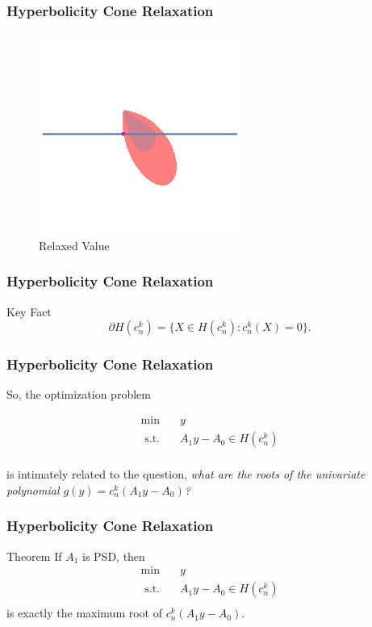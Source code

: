 \documentclass{beamer}
\newcommand{\st}{{\text{ s.t. }}}
\begin{document}
\begin{frame}
    \frametitle{Hyperbolicity Cone Relaxation}
    \begin{figure}[htpb]
        \centering
        \includegraphics[width=0.6\linewidth]{relaxed.png}
        \caption{Relaxed Value}%
        \label{fig:comparison_line}
    \end{figure}
\end{frame}
\begin{frame}
    \frametitle{Hyperbolicity Cone Relaxation}
    \begin{block}{Key Fact}
        \[\partial H(c_n^k) = \{X \in H(c_n^k) : c_n^k(X) = 0\}.\]
    \end{block}
\end{frame}
\begin{frame}
    \frametitle{Hyperbolicity Cone Relaxation}
    So, the optimization problem 

    \begin{equation*}
        \begin{aligned}
            \min\quad & y\\
            \st & A_1y - A_0 \in H(c_n^k)\\
        \end{aligned}
    \end{equation*}

    is intimately related to the question, \emph{what are the roots of the univariate polynomial $g(y) = c_n^k(A_1y-A_0)$?}
\end{frame}
\begin{frame}
    \frametitle{Hyperbolicity Cone Relaxation}
    \begin{block}{Theorem}
        If $A_1$ is PSD, then 
        \begin{equation*}
            \begin{aligned}
                \min\quad & y\\
                \st & A_1y - A_0 \in H(c_n^k)\\
            \end{aligned}
        \end{equation*}
        is exactly the maximum root of $c_n^k(A_1y-A_0)$.
    \end{block}
\end{frame}
\end{document}
